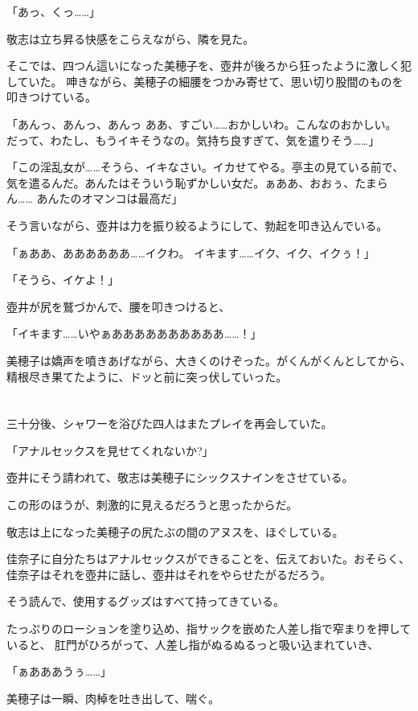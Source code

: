 ﻿\documentclass[
    book,tate,
    line_length=30zw,
    jafontsize=12pt,
    paper=b5j,
    landscape,
    ]{jlreq}
\begin{document}
「あっ、くっ……」

敬志は立ち昇る快感をこらえながら、隣を見た。

そこでは、四つん這いになった美穂子を、壺井が後ろから狂ったように激しく犯していた。
呻きながら、美穂子の細腰をつかみ寄せて、思い切り股間のものを叩きつけている。

「あんっ、あんっ、あんっ ああ、すごい……おかしいわ。こんなのおかしい。
だって、わたし、もうイキそうなの。気持ち良すぎて、気を遣りそう……」

「この淫乱女が……そうら、イキなさい。イカせてやる。亭主の見ている前で、
気を遣るんだ。あんたはそういう恥ずかしい女だ。ぁああ、おおぅ、たまらん……
あんたのオマンコは最高だ」

そう言いながら、壺井は力を振り絞るようにして、勃起を叩き込んでいる。

「ぁああ、ああああああ……イクわ。 イキます……イク、イク、イクぅ！」

「そうら、イケよ！」

壺井が尻を鷲づかんで、腰を叩きつけると、

「イキます……いやぁああああああああああ……！」

美穂子は嬌声を噴きあげながら、大きくのけぞった。がくんがくんとしてから、
精根尽き果てたように、ドッと前に突っ伏していった。

\section*{}

三十分後、シャワーを浴びた四人はまたプレイを再会していた。

「アナルセックスを見せてくれないか?」

壺井にそう請われて、敬志は美穂子にシックスナインをさせている。

この形のほうが、刺激的に見えるだろうと思ったからだ。

敬志は上になった美穂子の尻たぶの間のアヌスを、ほぐしている。

佳奈子に自分たちはアナルセックスができることを、伝えておいた。おそらく、
佳奈子はそれを壺井に話し、壺井はそれをやらせたがるだろう。

そう読んで、使用するグッズはすべて持ってきている。

たっぷりのローションを塗り込め、指サックを嵌めた人差し指で窄まりを押していると、
肛門がひろがって、人差し指がぬるぬるっと吸い込まれていき、

「ぁあああうぅ……」

美穂子は一瞬、肉棹を吐き出して、喘ぐ。
\end{document}
